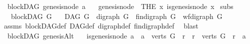 \begin{isabellebody}
\isanewline
{}\isamarkupfalse%
\ {\isacharparenleft}{\kern0pt}\ blockDAG{\isacharparenright}{\kern0pt}\ genesis{\isacharunderscore}{\kern0pt}node{\isacharcolon}{\kern0pt}{\isacharcolon}{\kern0pt}\ {\isachardoublequoteopen}{\isacharprime}{\kern0pt}a{\isachardoublequoteclose}\isanewline
\ \ \ {\isachardoublequoteopen}genesis{\isacharunderscore}{\kern0pt}node\ {\isacharequal}{\kern0pt}\ {\isacharparenleft}{\kern0pt}THE\ x{\isachardot}{\kern0pt}\ is{\isacharunderscore}{\kern0pt}genesis{\isacharunderscore}{\kern0pt}node\ x{\isacharparenright}{\kern0pt}{\isachardoublequoteclose}%
\isadelimdocument
%
\endisadelimdocument
%
\isatagdocument
%
\isamarkuptrue%
%
\endisatagdocument
{\isafolddocument}%
%
\isadelimdocument
%
\endisadelimdocument
{}\isamarkupfalse%
\ subs{\isacharcolon}{\kern0pt}\isanewline
\ \ \ {\isachardoublequoteopen}blockDAG\ G{\isachardoublequoteclose}\isanewline
\ \ \ {\isachardoublequoteopen}DAG\ G\ {\isasymand}\ digraph\ G\ {\isasymand}\ fin{\isacharunderscore}{\kern0pt}digraph\ G\ {\isasymand}\ wf{\isacharunderscore}{\kern0pt}digraph\ G{\isachardoublequoteclose}\isanewline
%
\isadelimproof
\ \ %
\endisadelimproof
%
\isatagproof
{}\isamarkupfalse%
\ assms\ blockDAG{\isacharunderscore}{\kern0pt}def\ DAG{\isacharunderscore}{\kern0pt}def\ digraph{\isacharunderscore}{\kern0pt}def\ fin{\isacharunderscore}{\kern0pt}digraph{\isacharunderscore}{\kern0pt}def\ \isamarkupfalse%
\ blast%
\endisatagproof
{\isafoldproof}%
%
\isadelimproof
%
\endisadelimproof
%
\isadelimdocument
%
\endisadelimdocument
%
\isatagdocument
%
\isamarkuptrue%
%
\endisatagdocument
{\isafolddocument}%
%
\isadelimdocument
%
\endisadelimdocument
{}\isamarkupfalse%
\ {\isacharparenleft}{\kern0pt}\ blockDAG{\isacharparenright}{\kern0pt}\ genesisAlt\ {\isacharcolon}{\kern0pt}\isanewline
\ \ {\isachardoublequoteopen}{\isacharparenleft}{\kern0pt}is{\isacharunderscore}{\kern0pt}genesis{\isacharunderscore}{\kern0pt}node\ a{\isacharparenright}{\kern0pt}\ {\isasymlongleftrightarrow}\ {\isacharparenleft}{\kern0pt}{\isacharparenleft}{\kern0pt}a\ {\isasymin}\ verts\ G{\isacharparenright}{\kern0pt}\ {\isasymand}\ {\isacharparenleft}{\kern0pt}{\isasymforall}r{\isachardot}{\kern0pt}\ \ {\isacharparenleft}{\kern0pt}r\ {\isasymin}\ verts\ G{\isacharparenright}{\kern0pt}\ {\isasymlongrightarrow}\ r\ {\isasymrightarrow}\isactrlsup {\isacharasterisk}{\kern0pt}\ a{\isacharparenright}{\kern0pt}{\isacharparenright}{\kern0pt}{\isachardoublequoteclose}\isanewline

\end{isabellebody}
